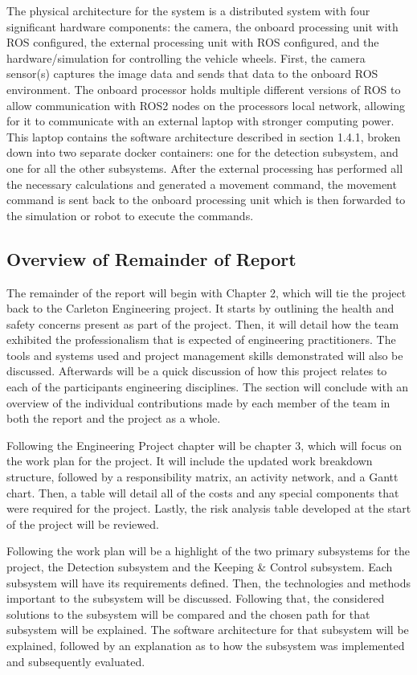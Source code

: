 \documentclass[titlepage, draft]{article}
\begin{document}
The physical architecture for the system is a distributed system with four significant hardware components: the camera, the onboard processing unit with ROS configured, the external processing unit with ROS configured, and the hardware/simulation for controlling the vehicle wheels. First, the camera sensor(s) captures the image data and sends that data to the onboard ROS environment. The onboard processor holds multiple different versions of ROS to allow communication with ROS2 nodes on the processors local network, allowing for it to communicate with an external laptop with stronger computing power. This laptop contains the software architecture described in section 1.4.1, broken down into two separate docker containers: one for the detection subsystem, and one for all the other subsystems. After the external processing has performed all the necessary calculations and generated a movement command, the movement command is sent back to the onboard processing unit which is then forwarded to the simulation or robot to execute the commands.

\subsection{Overview of Remainder of Report}

The remainder of the report will begin with Chapter 2, which will tie the project back to the Carleton Engineering project. It starts by outlining the health and safety concerns present as part of the project. Then, it will detail how the team exhibited the professionalism that is expected of engineering practitioners. The tools and systems used and project management skills demonstrated will also be discussed. Afterwards will be a quick discussion of how this project relates to each of the participants engineering disciplines. The section will conclude with an overview of the individual contributions made by each member of the team in both the report and the project as a whole.

Following the Engineering Project chapter will be chapter 3, which will focus on the work plan for the project. It will include the updated work breakdown structure, followed by a responsibility matrix, an activity network, and a Gantt chart. Then, a table will detail all of the costs and any special components that were required for the project. Lastly, the risk analysis table developed at the start of the project will be reviewed.

Following the work plan will be a highlight of the two primary subsystems for the project, the Detection subsystem and the Keeping \& Control subsystem. Each subsystem will have its requirements defined. Then, the technologies and methods important to the subsystem will be discussed. Following that, the considered solutions to the subsystem will be compared and the chosen path for that subsystem will be explained. The software architecture for that subsystem will be explained, followed by an explanation as to how the subsystem was implemented and subsequently evaluated.
\end{document}
